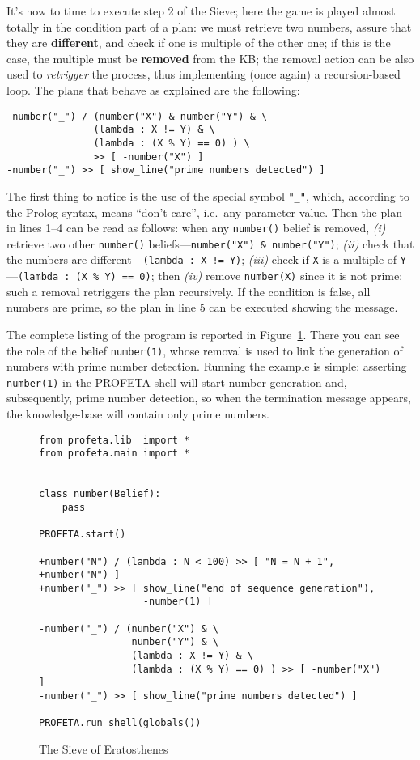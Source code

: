 It's now to time to execute step 2 of the Sieve; here the game is played
almost totally in the condition part of a plan: we must retrieve two
numbers, assure that they are \textbf{different}, and check if one is
multiple of the other one; if this is the case, the multiple must be
\textbf{removed} from the KB; the removal action can be also used to
\emph{retrigger} the process, thus implementing (once again) a
recursion-based loop.
The plans that behave as explained are the following:
\python%
\begin{lstlisting}
-number("_") / (number("X") & number("Y") & \
               (lambda : X != Y) & \
               (lambda : (X % Y) == 0) ) \
               >> [ -number("X") ]
-number("_") >> [ show_line("prime numbers detected") ]
\end{lstlisting}
The first thing to notice is the use of the special symbol \texttt{"\_"},
which, according to the Prolog syntax, means ``don't care'', i.e.~any
parameter value.
Then the plan in lines 1--4 can be read as follows: when any
\texttt{number()} belief is removed, \emph{(i)} retrieve two other \texttt{number()}
beliefs---\verb+number("X") & number("Y")+; \emph{(ii)} check that the
numbers are different---\verb+(lambda : X != Y)+; \emph{(iii)} check if
\texttt{X} is a multiple of \texttt{Y}---\verb+(lambda : (X % Y) == 0)+;
then \emph{(iv)} remove \texttt{number(X)} since it is not prime; such a
removal retriggers the plan recursively.
If the condition is false, all numbers are prime, so the plan in line 5 can
be executed showing the message.

The complete listing of the program is reported in Figure~\ref{fig:sieve}.
There you can see the role of the belief \texttt{number(1)}, whose removal
is used to link the generation of numbers with prime number detection.
Running the example is simple: asserting
\texttt{number(1)} in the PROFETA shell will start number generation and,
subsequently, prime number detection, so when the termination message
appears, the knowledge-base will contain only prime numbers.

\begin{figure}[b!]
\python%
\begin{lstlisting}
from profeta.lib  import *
from profeta.main import *


class number(Belief):
    pass

PROFETA.start()

+number("N") / (lambda : N < 100) >> [ "N = N + 1", +number("N") ]
+number("_") >> [ show_line("end of sequence generation"),
                  -number(1) ]

-number("_") / (number("X") & \
                number("Y") & \
                (lambda : X != Y) & \
                (lambda : (X % Y) == 0) ) >> [ -number("X") ]
-number("_") >> [ show_line("prime numbers detected") ]

PROFETA.run_shell(globals())
\end{lstlisting}
\caption{The Sieve of Eratosthenes}\label{fig:sieve}
\end{figure}




